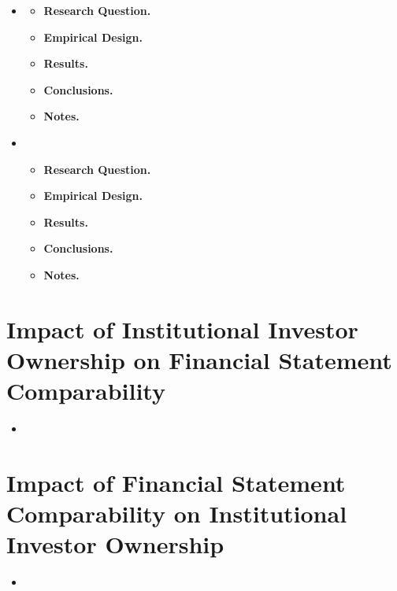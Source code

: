 \documentclass[12pt, letterpaper]{article}
\begin{document}
\begin{itemize}


\item \cite{bhojrajlee2002}
   \begin{itemize}
    \item \textbf{Research Question.}
    
    \item \textbf{Empirical Design.}
    
    \item \textbf{Results.}

    \item \textbf{Conclusions.}
    
    \item \textbf{Notes.} 
    \end{itemize}
\item
   \begin{itemize}
    \item \textbf{Research Question.}
    
    \item \textbf{Empirical Design.}
    
    \item \textbf{Results.}

    \item \textbf{Conclusions.}
    
    \item \textbf{Notes.} 
    \end{itemize}
\end{itemize}
\section{Impact of Institutional Investor Ownership on Financial Statement Comparability}
\begin{itemize}
\item 
\end{itemize}
\section{Impact of Financial Statement Comparability on Institutional Investor Ownership}
\begin{itemize}
\item 
\end{itemize}
\newpage


\end{document}
